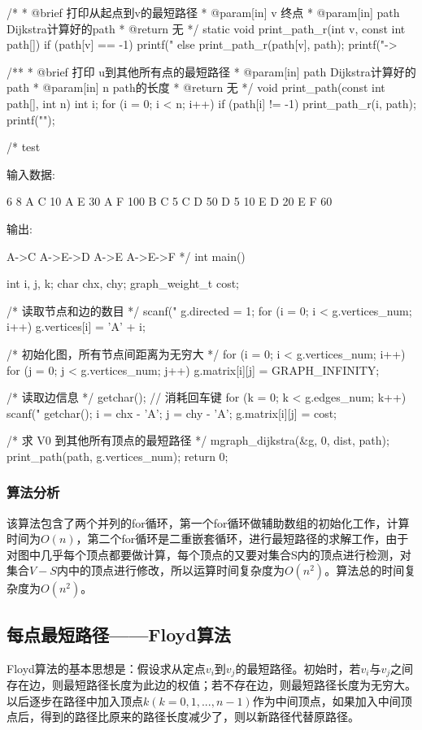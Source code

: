 \begin{Codex}[label=mgraph_dijkstra.c]
/*
 * @brief 打印从起点到v的最短路径
 * @param[in] v 终点
 * @param[in] path Dijkstra计算好的path
 * @return 无
 */
static void print_path_r(int v, const int path[]) {
    if (path[v] == -1) {
        printf("%
    } else {
        print_path_r(path[v], path);
        printf("->%
    }
}

/**
 * @brief 打印 u到其他所有点的最短路径
 * @param[in] path Dijkstra计算好的path
 * @param[in] n path的长度
 * @return 无
 */
void print_path(const int path[], int n) {
    int i;
    for (i = 0; i < n; i++) if (path[i] != -1) {
        print_path_r(i, path);
        printf("\n");
    }
}


/* test

输入数据:

6 8
A C 10
A E 30
A F 100
B C 5
C D 50
D 5 10
E D 20
E F 60

输出:

A->C
A->E->D
A->E
A->E->F
*/
int main() {
    int i, j, k;
    char chx, chy;
    graph_weight_t cost;

    /* 读取节点和边的数目 */
    scanf("%
    g.directed = 1;
    for (i = 0; i < g.vertices_num; i++) g.vertices[i] = 'A' + i;

    /* 初始化图，所有节点间距离为无穷大 */
    for (i = 0; i < g.vertices_num; i++) {
        for (j = 0; j < g.vertices_num; j++) {
            g.matrix[i][j] = GRAPH_INFINITY;
        }
    }

    /* 读取边信息 */
    getchar(); // 消耗回车键
    for (k = 0; k < g.edges_num; k++) {
        scanf("%
        getchar();
        i = chx - 'A';
        j = chy - 'A';
        g.matrix[i][j] = cost;
    }

    /* 求 V0 到其他所有顶点的最短路径 */
    mgraph_dijkstra(&g, 0, dist, path);
    print_path(path, g.vertices_num);
    return 0;
}
\end{Codex}

\subsubsection{算法分析}
该算法包含了两个并列的for循环，第一个for循环做辅助数组的初始化工作，计算时间为$O(n)$，第二个for循环是二重嵌套循环，进行最短路径的求解工作，由于对图中几乎每个顶点都要做计算，每个顶点的又要对集合S内的顶点进行检测，对集合$V-S$内中的顶点进行修改，所以运算时间复杂度为$O(n^2)$。算法总的时间复杂度为$O(n^2)$。


\subsection{每点最短路径——Floyd算法}
Floyd算法的基本思想是：假设求从定点$v_i$到$v_j$的最短路径。初始时，若$v_i$与$v_j$之间存在边，则最短路径长度为此边的权值；若不存在边，则最短路径长度为无穷大。以后逐步在路径中加入顶点$k(k=0,1,...,n-1)$作为中间顶点，如果加入中间顶点后，得到的路径比原来的路径长度减少了，则以新路径代替原路径。

